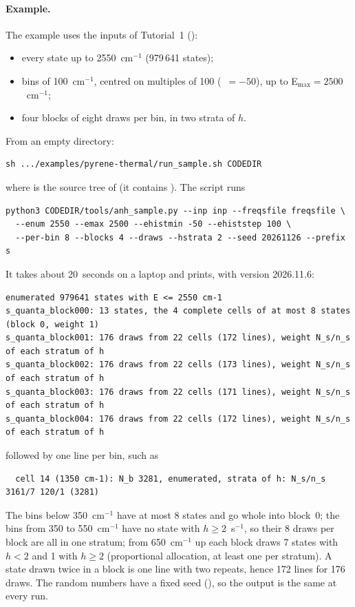 \paragraph{Example.} The example uses the inputs of
Tutorial~1 ():
\begin{itemize}
\item every state up to 2550~cm$^{-1}$ (979\,641 states);
\item bins of 100~cm$^{-1}$, centred on multiples of 100
(~$=-50$), up to E$_\mathrm{max}=2500$~cm$^{-1}$;
\item four blocks of eight draws per bin, in two strata of $h$.
\end{itemize}
From an empty directory:
\begin{lstlisting}
sh .../examples/pyrene-thermal/run_sample.sh CODEDIR
\end{lstlisting}
where  is the source tree of \ac{} (it contains
). The script runs
\begin{lstlisting}
python3 CODEDIR/tools/anh_sample.py --inp inp --freqsfile freqsfile \
  --enum 2550 --emax 2500 --ehistmin -50 --ehiststep 100 \
  --per-bin 8 --blocks 4 --draws --hstrata 2 --seed 20261126 --prefix s
\end{lstlisting}
It takes about 20~seconds on a laptop and prints, with version
2026.11.6:
\begin{lstlisting}
enumerated 979641 states with E <= 2550 cm-1
s_quanta_block000: 13 states, the 4 complete cells of at most 8 states (block 0, weight 1)
s_quanta_block001: 176 draws from 22 cells (172 lines), weight N_s/n_s of each stratum of h
s_quanta_block002: 176 draws from 22 cells (173 lines), weight N_s/n_s of each stratum of h
s_quanta_block003: 176 draws from 22 cells (171 lines), weight N_s/n_s of each stratum of h
s_quanta_block004: 176 draws from 22 cells (172 lines), weight N_s/n_s of each stratum of h
\end{lstlisting}
followed by one line per bin, such as
\begin{lstlisting}
  cell 14 (1350 cm-1): N_b 3281, enumerated, strata of h: N_s/n_s 3161/7 120/1 (3281)
\end{lstlisting}
The bins below 350~cm$^{-1}$ have at most 8 states and go whole into
block~0; the bins from 350 to 550~cm$^{-1}$ have no state with
$h\ge2$~s$^{-1}$, so their 8 draws per block are all in one stratum; from
650~cm$^{-1}$ up each block draws 7 states with $h<2$ and 1 with $h\ge2$
(proportional allocation, at least one per stratum). A state drawn twice
in a block is one line with two repeats, hence 172 lines for 176 draws.
The random numbers have a fixed seed (\flag{--seed}), so the output is the
same at every run.

